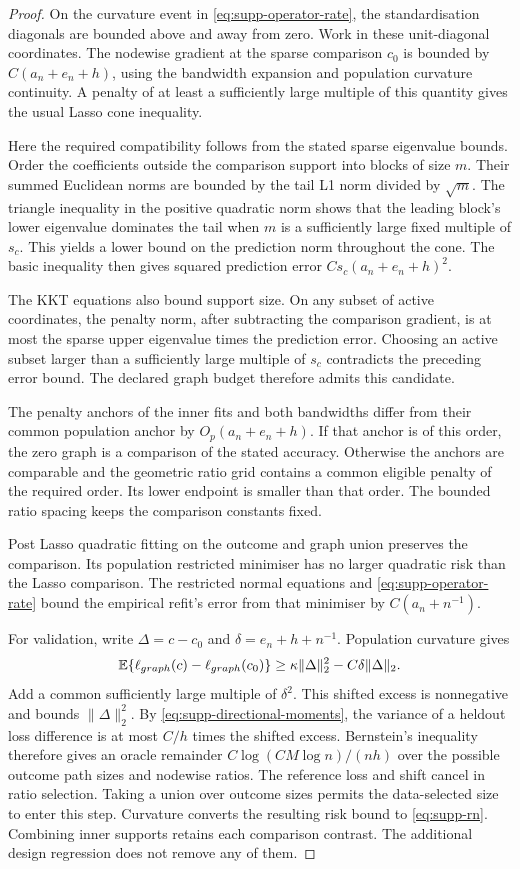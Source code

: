\begin{proof}
On the curvature event in \eqref{eq:supp-operator-rate}, the
standardisation diagonals are bounded above and away from zero.
Work in these unit-diagonal coordinates. The nodewise gradient at
the sparse comparison $c_0$ is bounded by
$C(a_n+e_n+h)$, using the bandwidth expansion and population
curvature continuity. A penalty of at least a sufficiently large
multiple of this quantity gives the usual Lasso cone inequality.

Here the required compatibility follows from the stated sparse
eigenvalue bounds. Order the coefficients outside the comparison
support into blocks of size $m$. Their summed Euclidean norms are
bounded by the tail L1 norm divided by $\sqrt m$. The triangle
inequality in the positive quadratic norm shows that the leading
block's lower eigenvalue dominates the tail when $m$ is a sufficiently
large fixed multiple of $s_c$. This yields a lower bound on the
prediction norm throughout the cone. The basic inequality then gives
squared prediction error $Cs_c(a_n+e_n+h)^2$.

The KKT equations also bound support size. On any subset of active
coordinates, the penalty norm, after subtracting the comparison
gradient, is at most the sparse upper eigenvalue times the prediction
error. Choosing an active subset larger than a sufficiently large
multiple of $s_c$ contradicts the preceding error bound. The declared
graph budget therefore admits this candidate.

The penalty anchors of the inner fits and both bandwidths differ from
their common population anchor by $O_p(a_n+e_n+h)$. If that anchor is
of this order, the zero graph is a comparison of the stated accuracy.
Otherwise the anchors are comparable and the geometric ratio grid
contains a common eligible penalty of the required order. Its lower
endpoint is smaller than that order. The bounded ratio spacing keeps
the comparison constants fixed.

Post Lasso quadratic fitting on the outcome and graph union preserves
the comparison. Its population restricted minimiser has no larger
quadratic risk than the Lasso comparison. The restricted normal
equations and \eqref{eq:supp-operator-rate} bound the empirical
refit's error from that minimiser by $C(a_n+n^{-1})$.

For validation, write $\Delta=c-c_0$ and
$\delta=e_n+h+n^{-1}$. Population curvature gives
\[
 \mathbb{E}\{\ell_{graph}(c)-\ell_{graph}(c_0)\}
       \geq\kappa\|\Delta\|_2^2-C\delta\|\Delta\|_2.
\]
Add a common sufficiently large multiple of $\delta^2$. This shifted
excess is nonnegative and bounds $\|\Delta\|_2^2$. By
\eqref{eq:supp-directional-moments}, the variance of a heldout loss
difference is at most $C/h$ times the shifted excess. Bernstein's
inequality therefore gives an oracle remainder
$C\log(CM\log n)/(nh)$ over the possible outcome path sizes and
nodewise ratios. The reference loss and shift cancel in ratio
selection. Taking a union over outcome sizes permits the
data-selected size to enter this step. Curvature converts the
resulting risk bound to \eqref{eq:supp-rn}. Combining inner supports
retains each comparison contrast. The additional design regression
does not remove any of them.
\end{proof}

